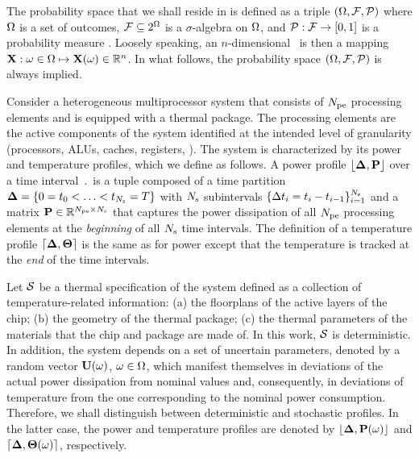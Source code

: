 The probability space that we shall reside in is defined as a triple $(\Omega, \mathcal{F}, \mathcal{P})$ where $\Omega$ is a set of outcomes, $\mathcal{F} \subseteq 2^\Omega$ is a $\sigma$-algebra on $\Omega$, and $\mathcal{P}: \mathcal{F} \to [0, 1]$ is a probability measure \cite{durrett2010}. Loosely speaking, an $n$-dimensional \rv\ is then a mapping $\mathbf{X}: \omega \in \Omega \mapsto \mathbf{X}(\omega) \in \mathbb{R}^n$. In what follows, the probability space $(\Omega, \mathcal{F}, \mathcal{P})$ is always implied.

Consider a heterogeneous multiprocessor system that consists of ${N_\text{pe}}$ processing elements and is equipped with a thermal package. The processing elements are the active components of the system identified at the intended level of granularity (processors, ALUs, caches, registers, \etc). The system is characterized by its power and temperature profiles, which we define as follows. A power profile $\profP$ over a time interval $\period$ is a tuple composed of a time partition $\boldsymbol{\Delta} = \{ 0 = t_0 < \dotsc < t_{N_\text{s}} = T \}$ with $N_\text{s}$ subintervals $\{ \Delta t_i = t_i - t_{i - 1} \}_{i = 1}^{N_\text{s}}$ and a matrix $\mP \in \real^{\cores \times \steps}$ that captures the power dissipation of all ${N_\text{pe}}$ processing elements at the \emph{beginning} of all $N_\text{s}$ time intervals. The definition of a temperature profile $\profT$ is the same as for power except that the temperature is tracked at the \emph{end} of the time intervals.

Let $\mathcal{S}$ be a thermal specification of the system defined as a collection of temperature-related information: (a) the floorplans of the active layers of the chip; (b) the geometry of the thermal package; (c) the thermal parameters of the materials that the chip and package are made of. In this work, $\mathcal{S}$ is deterministic. In addition, the system depends on a set of uncertain parameters, denoted by a random vector $\mathbf{U}(\omega)$, $\omega \in \Omega$, which manifest themselves in deviations of the actual power dissipation from nominal values and, consequently, in deviations of temperature from the one corresponding to the nominal power consumption. Therefore, we shall distinguish between deterministic and stochastic profiles. In the latter case, the power and temperature profiles are denoted by $\profP{\o}$ and $\profT{\o}$, respectively.

